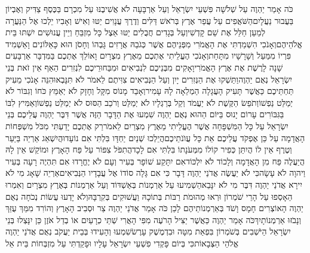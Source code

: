 \documentclass[../main/main.tex]{subfiles}
\begin{document}
\begin{multicols*}{\ncols}
כֹּה אָמַר יַהְוֶה עַל שְׁלֹשָׁה פִּשְׁעֵי יִשְׂרָאֵל וְעַל אַרְבָּעָה לֹא אֲשִׁיבֶנּוּ עַל מִכְרָם בַּכֶּסֶף צַדִּיק וְאֶבְיוֹן בַּעֲבוּר נַעֲלָיִם\PreVerseSpace{}הַשֹּׁאֲפִים עַל עֲפַר אֶרֶץ בְּרֹאשׁ דַּלִּים וְדֶרֶךְ עֲנָוִים יַטּוּ וְאִישׁ וְאָבִיו יֵלְכוּ אֶל הַנַּעֲרָה לְמַעַן חַלֵּל אֶת שֵׁם קָדְשִׁי\PreVerseSpace{}וְעַל בְּגָדִים חֲבֻלִים יַטּוּ אֵצֶל כָּל מִזְבֵּחַ וְיֵין עֲנוּשִׁים יִשְׁתּוּ בֵּית אֱלֹהֵיהֶם\PreVerseSpace{}וְאָנֹכִי הִשְׁמַדְתִּי אֶת הָאֱמֹרִי מִפְּנֵיהֶם אֲשֶׁר כְּגֹבַהּ אֲרָזִים גָּבְהוֹ וְחָסֹן הוּא כָּאַלּוֹנִים וָאַשְׁמִיד פִּרְיוֹ מִמַּעַל וְשָׁרָשָׁיו מִתָּחַת\PreVerseSpace{}וְאָנֹכִי הֶעֱלֵיתִי אֶתְכֶם מֵאֶרֶץ מִצְרָיִם וָאוֹלֵךְ אֶתְכֶם בַּמִּדְבָּר אַרְבָּעִים שָׁנָה לָרֶשֶׁת אֶת אֶרֶץ הָאֱמֹרִי\PreVerseSpace{}וָאָקִים מִבְּנֵיכֶם לִנְבִיאִים וּמִבַּחוּרֵיכֶם לִנְזִרִים הַאַף אֵין זֹאת בְּנֵי יִשְׂרָאֵל נְאֻם יַהְוֶה\PreVerseSpace{}וַתַּשְׁקוּ אֶת הַנְּזִרִים יָיִן וְעַל הַנְּבִיאִים צִוִּיתֶם לֵאמֹר לֹא תִּנָּבְאוּ\PreVerseSpace{}הִנֵּה אָנֹכִי מֵעִיק תַּחְתֵּיכֶם כַּאֲשֶׁר תָּעִיק הָעֲגָלָה הַמְלֵאָה לָהּ עָמִיר\PreVerseSpace{}וְאָבַד מָנוֹס מִקָּל וְחָזָק לֹא יְאַמֵּץ כֹּחוֹ וְגִבּוֹר לֹא יְמַלֵּט נַפְשׁוֹ\PreVerseSpace{}וְתֹפֵשׂ הַקֶּשֶׁת לֹא יַעֲמֹד וְקַל בְּרַגְלָיו לֹא יְמַלֵּט וְרֹכֵב הַסּוּס לֹא יְמַלֵּט נַפְשׁוֹ\PreVerseSpace{}וְאַמִּיץ לִבּוֹ בַּגִּבּוֹרִים עָרוֹם יָנוּס בַּיּוֹם הַהוּא נְאֻם יַהְוֶה \ClosedSection{}שִׁמְעוּ אֶת הַדָּבָר הַזֶּה אֲשֶׁר דִּבֶּר יַהְוֶה עֲלֵיכֶם בְּנֵי יִשְׂרָאֵל עַל כָּל הַמִּשְׁפָּחָה אֲשֶׁר הֶעֱלֵיתִי מֵאֶרֶץ מִצְרַיִם לֵאמֹר\PreVerseSpace{}רַק אֶתְכֶם יָדַעְתִּי מִכֹּל מִשְׁפְּחוֹת הָאֲדָמָה עַל כֵּן אֶפְקֹד עֲלֵיכֶם אֵת כָּל עֲוֺנֹתֵיכֶם\PreVerseSpace{}הֲיֵלְכוּ שְׁנַיִם יַחְדָּו בִּלְתִּי אִם נוֹעָדוּ\PreVerseSpace{}הֲיִשְׁאַג אַרְיֵה בַּיַּעַר וְטֶרֶף אֵין לוֹ הֲיִתֵּן כְּפִיר קוֹלוֹ מִמְּעֹנָתוֹ בִּלְתִּי אִם לָכָד\PreVerseSpace{}הֲתִפֹּל צִפּוֹר עַל פַּח הָאָרֶץ וּמוֹקֵשׁ אֵין לָהּ הֲיַעֲלֶה פַּח מִן הָאֲדָמָה וְלָכוֹד לֹא יִלְכּוֹד\PreVerseSpace{}אִם יִתָּקַע שׁוֹפָר בְּעִיר וְעָם לֹא יֶחֱרָדוּ אִם תִּהְיֶה רָעָה בְּעִיר וַיהוָה לֹא עָשָׂה\PreVerseSpace{}כִּי לֹא יַעֲשֶׂה אֲדֹנַי יַהְוֶה דָּבָר כִּי אִם גָּלָה סוֹדוֹ אֶל עֲבָדָיו הַנְּבִיאִים\PreVerseSpace{}אַרְיֵה שָׁאָג מִי לֹא יִירָא אֲדֹנַי יַהְוֶה דִּבֶּר מִי לֹא יִנָּבֵא\PreVerseSpace{}הַשְׁמִיעוּ עַל אַרְמְנוֹת בְּאַשְׁדּוֹד וְעַל אַרְמְנוֹת בְּאֶרֶץ מִצְרָיִם וְאִמְרוּ הֵאָסְפוּ עַל הָרֵי שֹׁמְרוֹן וּרְאוּ מְהוּמֹת רַבּוֹת בְּתוֹכָהּ וַעֲשׁוּקִים בְּקִרְבָּהּ\PreVerseSpace{}וְלֹא יָדְעוּ עֲשׂוֹת נְכֹחָה נְאֻם יַהְוֶה הָאוֹצְרִים חָמָס וָשֹׁד בְּאַרְמְנוֹתֵיהֶם לָכֵן כֹּה אָמַר אֲדֹנַי יַהְוֶה צַר וּסְבִיב הָאָרֶץ וְהוֹרִד מִמֵּךְ עֻזֵּךְ וְנָבֹזּוּ אַרְמְנוֹתָיִךְ\PreVerseSpace{}כֹּה אָמַר יַהְוֶה כַּאֲשֶׁר יַצִּיל הָרֹעֶה מִפִּי הָאֲרִי שְׁתֵּי כְרָעַיִם אוֹ בְדַל אֹזֶן כֵּן יִנָּצְלוּ בְּנֵי יִשְׂרָאֵל הַיֹּשְׁבִים בְּשֹׁמְרוֹן בִּפְאַת מִטָּה וּבִדְמֶשֶׁק עָרֶשׂ\PreVerseSpace{}שִׁמְעוּ וְהָעִידוּ בְּבֵית יַעֲקֹב נְאֻם אֲדֹנַי יַהְוֶה אֱלֹהֵי הַצְּבָאוֹת\PreVerseSpace{}כִּי בְּיוֹם פָּקְדִי פִשְׁעֵי יִשְׂרָאֵל עָלָיו וּפָקַדְתִּי עַל מִזְבְּחוֹת בֵּית אֵל 
\end{multicols*}
\end{document}
